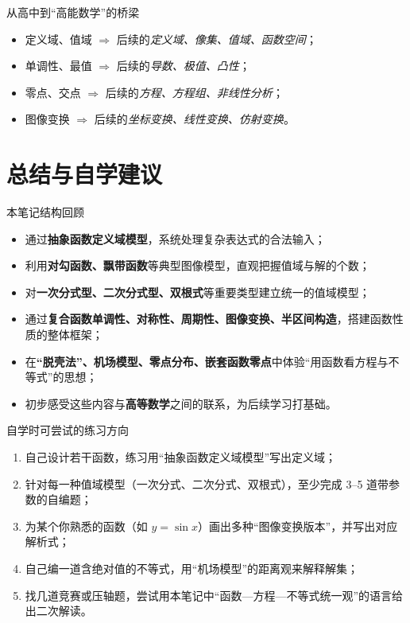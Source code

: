 \documentclass[a4paper,11pt]{ctexart}
\begin{document}
\begin{summarybox}[mathnote coverage=soft]{从高中到“高能数学”的桥梁}
  \begin{itemize}
    \item 定义域、值域 $\Rightarrow$ 后续的\emph{定义域、像集、值域、函数空间}；
    \item 单调性、最值 $\Rightarrow$ 后续的\emph{导数、极值、凸性}；
    \item 零点、交点 $\Rightarrow$ 后续的\emph{方程、方程组、非线性分析}；
    \item 图像变换 $\Rightarrow$ 后续的\emph{坐标变换、线性变换、仿射变换}。
  \end{itemize}
\end{summarybox}

\section{总结与自学建议}

\begin{summarybox}[mathnote coverage=line]{本笔记结构回顾}
  \begin{itemize}
    \item 通过\textbf{抽象函数定义域模型}，系统处理复杂表达式的合法输入；
    \item 利用\textbf{对勾函数、飘带函数}等典型图像模型，直观把握值域与解的个数；
    \item 对\textbf{一次分式型、二次分式型、双根式}等重要类型建立统一的值域模型；
    \item 通过\textbf{复合函数单调性、对称性、周期性、图像变换、半区间构造}，搭建函数性质的整体框架；
    \item 在\textbf{“脱壳法”、机场模型、零点分布、嵌套函数零点}中体验“用函数看方程与不等式”的思想；
    \item 初步感受这些内容与\textbf{高等数学}之间的联系，为后续学习打基础。
  \end{itemize}
\end{summarybox}

\begin{notebox}{自学时可尝试的练习方向}
  \begin{enumerate}
    \item 自己设计若干函数，练习用“抽象函数定义域模型”写出定义域；
    \item 针对每一种值域模型（一次分式、二次分式、双根式），至少完成 3--5 道带参数的自编题；
    \item 为某个你熟悉的函数（如 $y=\sin x$）画出多种“图像变换版本”，并写出对应解析式；
    \item 自己编一道含绝对值的不等式，用“机场模型”的距离观来解释解集；
    \item 找几道竞赛或压轴题，尝试用本笔记中“函数—方程—不等式统一观”的语言给出二次解读。
  \end{enumerate}
\end{notebox}

\ifdefined\MathNoteBookMode\else
\end{document}
